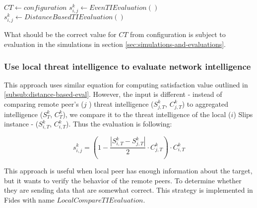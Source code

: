 \begin{algorithm}
\caption{$ThresholdTIEvaluation$}\label{alg:threshold-ti-evaluation}
\begin{algorithmic}[1]
\State ${CT} \gets configuration$ 
	\State $s^{k}_{i, j} \gets EvenTIEvaluation()$
\Else
    \State $s^{k}_{i, j} \gets DistanceBasedTIEvaluation()$
\EndIf
\end{algorithmic}
\end{algorithm}

\noindent What should be the correct value for $CT$ from configuration is subject to evaluation in the simulations in section \ref{sec:simulations-and-evaluations}.

\subsubsection{Use local threat intelligence to evaluate network intelligence}
This approach uses similar equation for computing satisfaction value outlined in \ref{subsub:distance-based-eval}. However, the input is different - instead of comparing remote peer's ($j$ ) threat intelligence ($S^{k}_{j, T}$, $C^{k}_{j, T}$) to aggregated intelligence ($S^{k}_{T}$, $C^{k}_{T}$), we compare it to the threat intelligence of the local ($i$) Slips instance - ($S^{k}_{i, T}$, $C^{k}_{i, T}$). Thus the evaluation is following:

\begin{equation}
s^{k}_{i, j} = (1 - \frac{|{S}^{k}_{i, T} - S^{k}_{j, T}|}{2} \cdot C^{k}_{j, T}) \cdot C^{k}_{i, T}
\end{equation}

This approach is useful when local peer has enough information about the target, but it wants to verify the behavior of the remote peers.
To determine whether they are sending data that are somewhat correct. This strategy is implemented in Fides with name $LocalCompareTIEvaluation$.